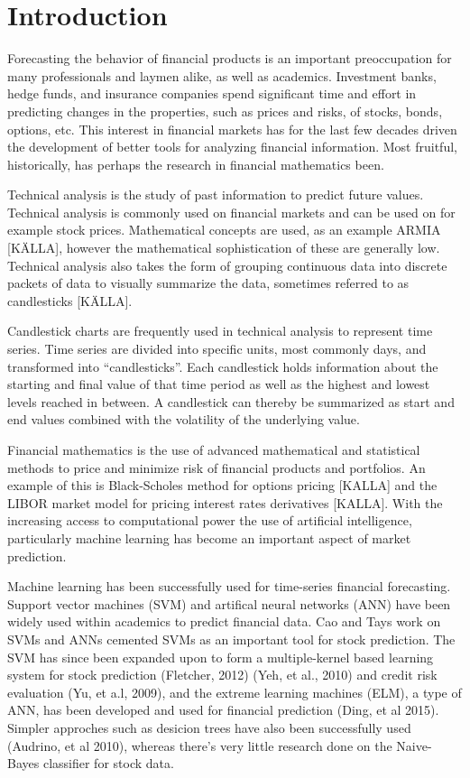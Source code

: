 \documentclass{article}
\begin{document}
\section{Introduction}
Forecasting the behavior of financial products is an important preoccupation for many professionals and laymen alike, as well as academics. Investment banks, hedge funds, and insurance companies spend significant time and effort in predicting changes in the properties, such as prices and risks, of stocks, bonds, options, etc. This interest in financial markets has for the last few decades driven the development of better tools for analyzing financial information. Most fruitful, historically, has perhaps the research in financial mathematics been. 

Technical analysis is the study of past information to predict future values. Technical analysis is commonly used on financial markets and can be used on for example stock prices. Mathematical concepts are used, as an example ARMIA [KÄLLA], however the mathematical sophistication of these are generally low. Technical analysis also takes the form of grouping continuous data into discrete packets of data to visually summarize the data, sometimes referred to as candlesticks [KÄLLA].

Candlestick charts are frequently used in technical analysis to represent time series. Time series are divided into specific units, most commonly days, and transformed into “candlesticks”. Each candlestick holds information about the starting and final value of that time period as well as the highest and lowest levels reached in between. A candlestick can thereby be summarized as start and end values combined with the volatility of the underlying value.

Financial mathematics is the use of advanced mathematical and statistical methods to price and minimize risk of financial products and portfolios. An example of this is Black-Scholes method for options pricing [KALLA] and the LIBOR market model for pricing interest rates derivatives [KALLA]. With the increasing access to computational power the use of artificial intelligence, particularly machine learning has become an important aspect of market prediction. 

Machine learning has been successfully used for time-series financial forecasting. Support vector machines (SVM) and artifical neural networks (ANN) have been widely used  within academics to predict financial data. Cao and Tays work on SVMs and ANNs cemented SVMs as an important tool for stock prediction. The SVM has since been expanded upon to form a multiple-kernel based learning system for stock prediction (Fletcher, 2012) (Yeh, et al., 2010) and credit risk evaluation (Yu, et a.l, 2009), and the extreme learning machines (ELM), a type of ANN, has been developed and used for financial prediction (Ding, et al 2015). Simpler approches such as desicion trees have also been successfully used (Audrino, et al 2010), whereas there's very little research done on the Naive-Bayes classifier for stock data.
\end{document}
